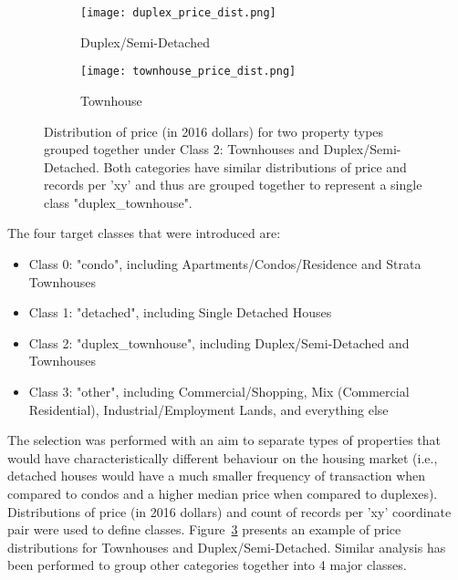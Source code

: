 \begin{figure}[ht]
    \centering
    \begin{subfigure}{\linewidth}
        \centering
        \texttt{[image: duplex\_price\_dist.png]}
        \label{fig:duplex_price_dist}
        \caption{Duplex/Semi-Detached}
    \end{subfigure}

    \begin{subfigure}{\linewidth}
        \centering
        \texttt{[image: townhouse\_price\_dist.png]}
        \label{fig:townhouse_price_dist}
        \caption{Townhouse}
    \end{subfigure}
    \caption{Distribution of price (in 2016 dollars) for two property types grouped together under Class 2: Townhouses and Duplex/Semi-Detached.
    Both categories have similar distributions of price and records per 'xy' and thus are grouped together to represent a single class "duplex\_townhouse".}
    \label{fig:class_2_price_dist}
\end{figure}

The four target classes that were introduced are:

\begin{itemize}
    \item Class 0: "condo", including Apartments/Condos/Residence and Strata Townhouses
    \item Class 1: "detached", including Single Detached Houses
    \item Class 2: "duplex\_townhouse", including Duplex/Semi-Detached and Townhouses
    \item Class 3: "other", including Commercial/Shopping, Mix (Commercial Residential), Industrial/Employment Lands, and everything else
\end{itemize}

The selection was performed with an aim to separate types of properties that would have characteristically different behaviour on the housing market (i.e., detached houses would have a much smaller frequency of transaction when compared to condos and a higher median price when compared to duplexes).
Distributions of price (in 2016 dollars) and count of records per 'xy' coordinate pair were used to define classes.
Figure~\ref{fig:class_2_price_dist} presents an example of price distributions for Townhouses and Duplex/Semi-Detached.
Similar analysis has been performed to group other categories together into 4 major classes.

